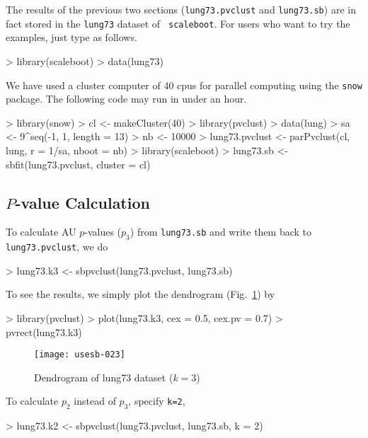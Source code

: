 \documentclass[a4paper]{amsart}
\begin{document}
The results of the previous two sections ({\tt lung73.pvclust} and
{\tt lung73.sb}) are in fact stored in the {\tt lung73} dataset of {\tt
scaleboot}. For users who want to try the examples, just type as follows.
\begin{Schunk}
\begin{Sinput}
> library(scaleboot)
> data(lung73)
\end{Sinput}
\end{Schunk}

We have used a cluster computer of 40 cpus for parallel
computing using the {\tt snow} package.
The following code may run in under an hour.
\begin{Schunk}
\begin{Sinput}
> library(snow)
> cl <- makeCluster(40)
> library(pvclust)
> data(lung)
> sa <- 9^seq(-1, 1, length = 13)
> nb <- 10000
> lung73.pvclust <- parPvclust(cl, lung, r = 1/sa, nboot = nb)
> library(scaleboot)
> lung73.sb <- sbfit(lung73.pvclust, cluster = cl)
\end{Sinput}
\end{Schunk}

\subsection{$P$-value Calculation}

To calculate AU $p$-values ($p_3$) from {\tt lung73.sb} and write them
back to {\tt lung73.pvclust}, we do
\begin{Schunk}
\begin{Sinput}
> lung73.k3 <- sbpvclust(lung73.pvclust, lung73.sb)
\end{Sinput}
\end{Schunk}
To see the results, we simply plot the dendrogram
(Fig.~\ref{fig:lung73tree}) by
\begin{Schunk}
\begin{Sinput}
> library(pvclust)
> plot(lung73.k3, cex = 0.5, cex.pv = 0.7)
> pvrect(lung73.k3)
\end{Sinput}
\end{Schunk}
\begin{figure}
\begin{center}
\texttt{[image: usesb-023]}
\caption{Dendrogram of lung73 dataset ($k=3$)}\label{fig:lung73tree}
\end{center}
\end{figure}
To calculate $p_2$ instead of $p_3$, specify {\tt k=2},
\begin{Schunk}
\begin{Sinput}
> lung73.k2 <- sbpvclust(lung73.pvclust, lung73.sb, k = 2)
\end{Sinput}
\end{Schunk}
\end{document}

